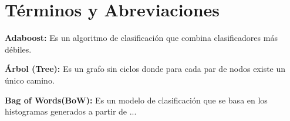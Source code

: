 \chapter*{Términos y Abreviaciones}

\textbf{Adaboost:} Es un algoritmo de clasificación que combina clasificadores más débiles.

\textbf{Árbol (Tree):} Es un grafo sin ciclos donde para cada par de nodos existe un único camino.

\textbf{Bag of Words(BoW):} Es un modelo de clasificación que se basa en los histogramas generados a partir de ...
